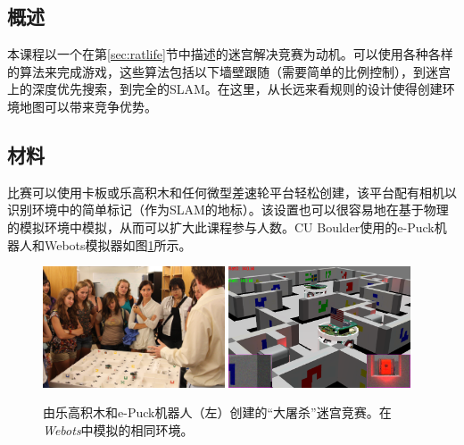 \subsection{概述}
本课程以一个在第\ref{sec:ratlife}节中描述的迷宫解决竞赛为动机。可以使用各种各样的算法来完成游戏，这些算法包括以下墙壁跟随（需要简单的比例控制），到迷宫上的深度优先搜索，到完全的SLAM。在这里，从长远来看规则的设计使得创建环境地图可以带来竞争优势。


\subsection{材料}
比赛可以使用卡板或乐高积木和任何微型差速轮平台轻松创建，该平台配有相机以识别环境中的简单标记（作为SLAM的地标）。该设置也可以很容易地在基于物理的模拟环境中模拟，从而可以扩大此课程参与人数。CU Boulder使用的e-Puck机器人和Webots模拟器如图\ref{fig:ratslifereal}所示。

\begin{figure}[!htb]
\includegraphics[width=0.48\textwidth]{figs/ratslife_real}
\includegraphics[width=0.48\textwidth]{figs/ratslife_webots}
\caption{由乐高积木和e-Puck机器人（左）创建的“大屠杀”迷宫竞赛。在\emph{Webots}中模拟的相同环境。}
\label{fig:ratslifereal}
\end{figure}


